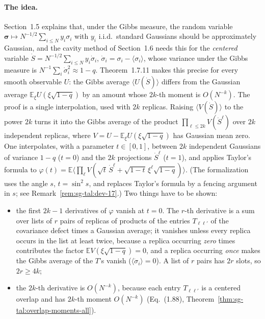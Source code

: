 \paragraph{The idea.}
Section~1.5 explains that, under the Gibbs measure, the random variable
$\boldsymbol\sigma\mapsto N^{-1/2}\sum_{i\le N}y_i\sigma_i$ with $y_i$ i.i.d.\ standard Gaussians
should be approximately Gaussian, and the cavity method of Section~1.6 needs this for the
\emph{centered} variable $\dot S=N^{-1/2}\sum_{i\le N}y_i\dot\sigma_i$, $\dot\sigma_i=\sigma_i-\langle\sigma_i\rangle$,
whose variance under the Gibbs measure is $N^{-1}\sum_i\dot\sigma_i^2\approx 1-q$.
Theorem~1.7.11 makes this precise for every smooth observable $U$: the Gibbs average
$\langle U(\dot S)\rangle$ differs from the Gaussian average $\mathbb E_\xi U(\xi\sqrt{1-q})$ by an amount whose
$2k$-th moment is $O(N^{-k})$.
The proof is a single interpolation, used with $2k$ replicas.
Raising $\langle V(\dot S)\rangle$ to the power $2k$ turns it into the Gibbs average of the product
$\prod_{\ell\le 2k}V(\dot S^\ell)$ over $2k$ independent replicas, where $V=U-\mathbb E_\xi U(\xi\sqrt{1-q})$ has
Gaussian mean zero.
One interpolates, with a parameter $t\in[0,1]$, between $2k$ independent Gaussians of variance $1-q$
($t=0$) and the $2k$ projections $\dot S^\ell$ ($t=1$), and applies Taylor's formula to
$\varphi(t)=\mathbb E\langle\prod_\ell V(\sqrt t\,\dot S^\ell+\sqrt{1-t}\,\xi^\ell\sqrt{1-q})\rangle$.
(The formalization uses the angle $s$, $t=\sin^2s$, and replaces Taylor's formula by a fencing argument in $s$; see Remark~\ref{rem:sg-tal:dev-17}.)
Two things have to be shown:
\begin{itemize}
\item the first $2k-1$ derivatives of $\varphi$ vanish at $t=0$.  The $r$-th derivative is a sum over lists of $r$
  pairs of replicas of products of the entries $T_{\ell\ell'}$ of the covariance defect times a Gaussian average; it
  vanishes unless every replica occurs in the list at least twice, because a replica occurring \emph{zero} times
  contributes the factor $\mathbb E V(\xi\sqrt{1-q})=0$, and a replica occurring \emph{once} makes the Gibbs average of the
  $T$'s vanish ($\langle\dot\sigma_i\rangle=0$).  A list of $r$ pairs has $2r$ slots, so $2r\ge 4k$;
\item the $2k$-th derivative is $O(N^{-k})$, because each entry $T_{\ell\ell'}$ is a centered overlap and has $2k$-th
  moment $O(N^{-k})$ (Eq.~(1.88), Theorem~\ref{thm:sg-tal:overlap-moments-all}).
\end{itemize}


